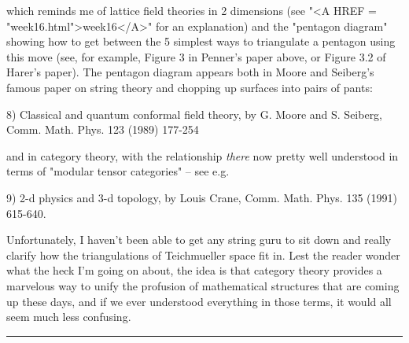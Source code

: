 which reminds me of lattice field theories in 2 dimensions (see "<A HREF = "week16.html">week16</A>"
for an explanation) and the "pentagon diagram" showing how to get
between the 5 simplest ways to triangulate a pentagon using this move
(see, for example, Figure 3 in Penner's paper above, or Figure 3.2 of
Harer's paper).  The pentagon diagram appears both in Moore and
Seiberg's famous paper on string theory and chopping up surfaces into
pairs of pants:

8) Classical and quantum conformal field theory, by G. Moore and S.
Seiberg, Comm. Math. Phys. 123 (1989) 177-254

and in category theory, with the relationship \emph{there} now pretty well
understood in terms of "modular tensor categories"  -- see e.g. 

9) 2-d physics and 3-d topology, by Louis Crane, Comm. Math. Phys. 135
(1991) 615-640.  

Unfortunately, I haven't been able to get any string guru to sit down 
and really clarify how the triangulations of Teichmueller space fit in.
Lest the reader wonder what the heck I'm going on about, the idea is
that category theory provides a marvelous way to unify the profusion of
mathematical structures that are coming up these days, and if we ever
understood everything in those terms, it would all seem much less
confusing.  
\par\noindent\rule{\textwidth}{0.4pt}

